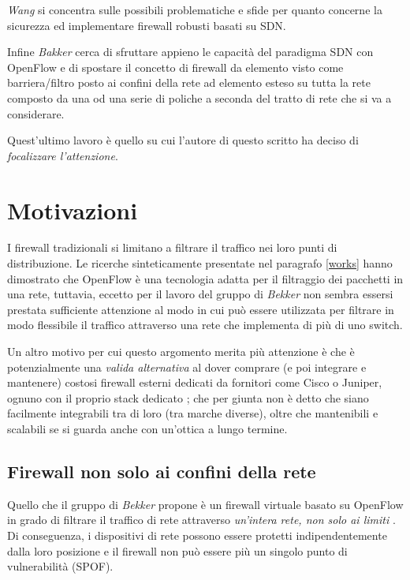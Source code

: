 \textit{Wang} \cite{wang2013towards} si concentra sulle possibili problematiche e sfide per quanto concerne la sicurezza ed implementare firewall robusti basati su SDN.

Infine \textit{Bakker} \cite{bakker2016network} cerca di sfruttare appieno le capacità del paradigma SDN con OpenFlow e di spostare il concetto di firewall da elemento visto come barriera/filtro posto ai confini della rete ad elemento esteso su tutta la rete composto da una od una serie di poliche a seconda del tratto di rete che si va a considerare.

Quest'ultimo lavoro è quello su cui l'autore di questo scritto ha deciso di \textit{focalizzare l'attenzione}.


\section{Motivazioni}

I firewall tradizionali si limitano a filtrare il traffico nei loro punti di distribuzione.
Le ricerche sinteticamente presentate nel paragrafo \ref{works} hanno dimostrato che OpenFlow è una tecnologia adatta per il filtraggio dei pacchetti in una rete, tuttavia, eccetto per il lavoro del gruppo di \textit{Bekker} \cite{bakker2016network} non sembra essersi prestata sufficiente attenzione al modo in cui può essere utilizzata per filtrare in modo flessibile il traffico attraverso una rete che implementa di più di uno switch.

Un altro motivo per cui questo argomento merita più attenzione è che è potenzialmente una \textit{valida alternativa} al dover comprare (e poi integrare e mantenere) costosi firewall esterni dedicati da fornitori come Cisco o Juniper, ognuno con il proprio stack dedicato \cite{suh2014building}; che per giunta non è detto che siano facilmente integrabili tra di loro (tra marche diverse), oltre che mantenibili e scalabili se si guarda anche con un'ottica a lungo termine.

\subsection{Firewall non solo ai confini della rete}\label{firewall_confini}
Quello che il gruppo di \textit{Bekker} propone è un firewall virtuale basato su OpenFlow in grado di filtrare il traffico di rete attraverso \textit{un'intera rete, non solo ai limiti} \cite{bakker2016network}. Di conseguenza, i dispositivi di rete possono essere protetti indipendentemente dalla loro posizione e il firewall non può essere più un singolo punto di vulnerabilità (SPOF).


